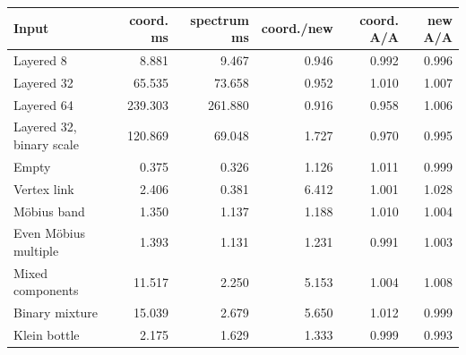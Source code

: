 \begin{center}
\small
\begin{tabular}{lrrrrr}
\toprule
Input & coord. ms & spectrum ms & coord./new & coord. A/A & new A/A\\
\midrule
Layered 8 & 8.881 & 9.467 & 0.946 & 0.992 & 0.996\\
Layered 32 & 65.535 & 73.658 & 0.952 & 1.010 & 1.007\\
Layered 64 & 239.303 & 261.880 & 0.916 & 0.958 & 1.006\\
Layered 32, binary scale & 120.869 & 69.048 & 1.727 & 0.970 & 0.995\\
Empty & 0.375 & 0.326 & 1.126 & 1.011 & 0.999\\
Vertex link & 2.406 & 0.381 & 6.412 & 1.001 & 1.028\\
M\"obius band & 1.350 & 1.137 & 1.188 & 1.010 & 1.004\\
Even M\"obius multiple & 1.393 & 1.131 & 1.231 & 0.991 & 1.003\\
Mixed components & 11.517 & 2.250 & 5.153 & 1.004 & 1.008\\
Binary mixture & 15.039 & 2.679 & 5.650 & 1.012 & 0.999\\
Klein bottle & 2.175 & 1.629 & 1.333 & 0.999 & 0.993\\
\bottomrule
\end{tabular}
\end{center}
